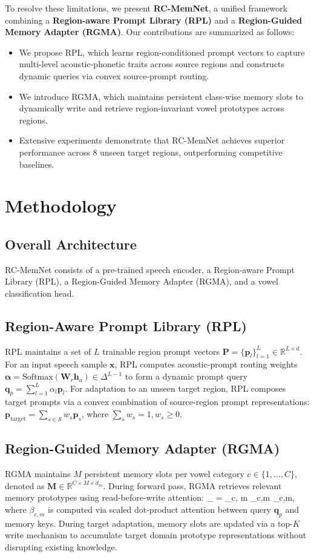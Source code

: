 \documentclass[letterpaper]{article} %
\begin{document}
To resolve these limitations, we present \textbf{RC-MemNet}, a unified framework combining a \textbf{Region-aware Prompt Library (RPL)} and a \textbf{Region-Guided Memory Adapter (RGMA)}.
Our contributions are summarized as follows:
\begin{itemize}
\item We propose RPL, which learns region-conditioned prompt vectors to capture multi-level acoustic-phonetic traits across source regions and constructs dynamic queries via convex source-prompt routing.
\item We introduce RGMA, which maintains persistent class-wise memory slots to dynamically write and retrieve region-invariant vowel prototypes across regions.
\item Extensive experiments demonstrate that RC-MemNet achieves superior performance across 8 unseen target regions, outperforming competitive baselines.
\end{itemize}

\section{Methodology}
\subsection{Overall Architecture}
RC-MemNet consists of a pre-trained speech encoder, a Region-aware Prompt Library (RPL), a Region-Guided Memory Adapter (RGMA), and a vowel classification head.

\subsection{Region-Aware Prompt Library (RPL)}
RPL maintains a set of $L$ trainable region prompt vectors $\mathbf{P} = \{\mathbf{p}_l\}_{l=1}^L \in \mathbb{R}^{L \times d}$. For an input speech sample $\mathbf{x}$, RPL computes acoustic-prompt routing weights $\boldsymbol{\alpha} = \mathrm{Softmax}(\mathbf{W}_r \mathbf{h}_a) \in \Delta^{L-1}$ to form a dynamic prompt query $\mathbf{q}_p = \sum_{l=1}^L \alpha_l \mathbf{p}_l$.
For adaptation to an unseen target region, RPL composes target prompts via a convex combination of source-region prompt representations: $\mathbf{p}_{\text{target}} = \sum_{s \in \mathcal{S}} w_s \mathbf{p}_s$, where $\sum_{s} w_s = 1, w_s \ge 0$.

\subsection{Region-Guided Memory Adapter (RGMA)}
RGMA maintains $M$ persistent memory slots per vowel category $c \in \{1, \dots, C\}$, denoted as $\mathbf{M} \in \mathbb{R}^{C \times M \times d_m}$.
During forward pass, RGMA retrieves relevant memory prototypes using read-before-write attention:
_{} = \sum_{c, m} \beta_{c,m} _{c,m},
where $\beta_{c,m}$ is computed via scaled dot-product attention between query $\mathbf{q}_p$ and memory keys.
During target adaptation, memory slots are updated via a top-$K$ write mechanism to accumulate target domain prototype representations without disrupting existing knowledge.
\end{document}
